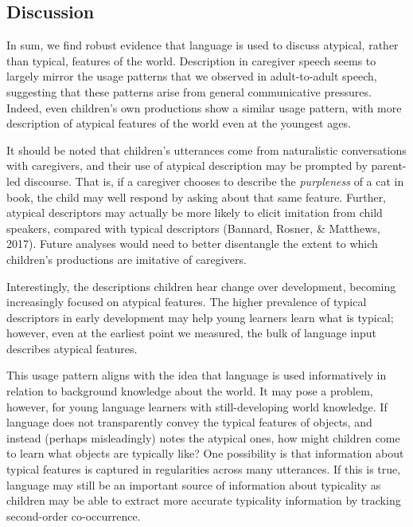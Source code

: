 \documentclass[10pt, letterpaper]{article}
\begin{document}
\hypertarget{discussion}{%
\subsection{Discussion}\label{discussion}}

In sum, we find robust evidence that language is used to discuss
atypical, rather than typical, features of the world. Description in
caregiver speech seems to largely mirror the usage patterns that we
observed in adult-to-adult speech, suggesting that these patterns arise
from general communicative pressures. Indeed, even children's own
productions show a similar usage pattern, with more description of
atypical features of the world even at the youngest ages.

It should be noted that children's utterances come from naturalistic
conversations with caregivers, and their use of atypical description may
be prompted by parent-led discourse. That is, if a caregiver chooses to
describe the \emph{purpleness} of a cat in book, the child may well
respond by asking about that same feature. Further, atypical descriptors
may actually be more likely to elicit imitation from child speakers,
compared with typical descriptors (Bannard, Rosner, \& Matthews, 2017).
Future analyses would need to better disentangle the extent to which
children's productions are imitative of caregivers.

Interestingly, the descriptions children hear change over development,
becoming increasingly focused on atypical features. The higher
prevalence of typical descriptors in early development may help young
learners learn what is typical; however, even at the earliest point we
measured, the bulk of language input describes atypical features.

This usage pattern aligns with the idea that language is used
informatively in relation to background knowledge about the world. It
may pose a problem, however, for young language learners with
still-developing world knowledge. If language does not transparently
convey the typical features of objects, and instead (perhaps
misleadingly) notes the atypical ones, how might children come to learn
what objects are typically like? One possibility is that information
about typical features is captured in regularities across many
utterances. If this is true, language may still be an important source
of information about typicality as children may be able to extract more
accurate typicality information by tracking second-order co-occurrence.
\end{document}

